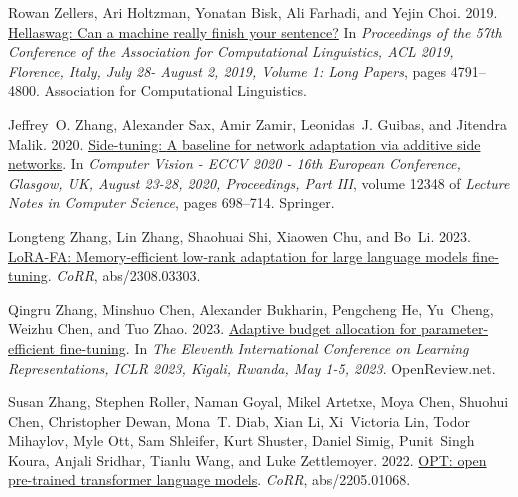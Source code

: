 \documentclass[11pt,dvipsnames]{article}
\begin{document}
{\begin{thebibliography}{73}
Rowan Zellers, Ari Holtzman, Yonatan Bisk, Ali Farhadi, and Yejin Choi. 2019.
\newblock \href {https://doi.org/10.18653/v1/p19-1472} {Hellaswag: Can a
  machine really finish your sentence?}
\newblock In \emph{Proceedings of the 57th Conference of the Association for
  Computational Linguistics, {ACL} 2019, Florence, Italy, July 28- August 2,
  2019, Volume 1: Long Papers}, pages 4791--4800. Association for Computational
  Linguistics.

Jeffrey~O. Zhang, Alexander Sax, Amir Zamir, Leonidas~J. Guibas, and Jitendra
  Malik. 2020.
\newblock \href {https://doi.org/10.1007/978-3-030-58580-8\_41} {Side-tuning:
  {A} baseline for network adaptation via additive side networks}.
\newblock In \emph{Computer Vision - {ECCV} 2020 - 16th European Conference,
  Glasgow, UK, August 23-28, 2020, Proceedings, Part {III}}, volume 12348 of
  \emph{Lecture Notes in Computer Science}, pages 698--714. Springer.

Longteng Zhang, Lin Zhang, Shaohuai Shi, Xiaowen Chu, and Bo~Li.
  2023{}.
\newblock \href {https://doi.org/10.48550/ARXIV.2308.03303} {{LoRA-FA}:
  Memory-efficient low-rank adaptation for large language models fine-tuning}.
\newblock \emph{CoRR}, abs/2308.03303.

Qingru Zhang, Minshuo Chen, Alexander Bukharin, Pengcheng He, Yu~Cheng, Weizhu
  Chen, and Tuo Zhao. 2023{}.
\newblock \href {https://openreview.net/pdf?id=lq62uWRJjiY} {Adaptive budget
  allocation for parameter-efficient fine-tuning}.
\newblock In \emph{The Eleventh International Conference on Learning
  Representations, {ICLR} 2023, Kigali, Rwanda, May 1-5, 2023}. OpenReview.net.

Susan Zhang, Stephen Roller, Naman Goyal, Mikel Artetxe, Moya Chen, Shuohui
  Chen, Christopher Dewan, Mona~T. Diab, Xian Li, Xi~Victoria Lin, Todor
  Mihaylov, Myle Ott, Sam Shleifer, Kurt Shuster, Daniel Simig, Punit~Singh
  Koura, Anjali Sridhar, Tianlu Wang, and Luke Zettlemoyer. 2022{}.
\newblock \href {https://doi.org/10.48550/arXiv.2205.01068} {{OPT:} open
  pre-trained transformer language models}.
\newblock \emph{CoRR}, abs/2205.01068.


\end{thebibliography}}
\end{document}

